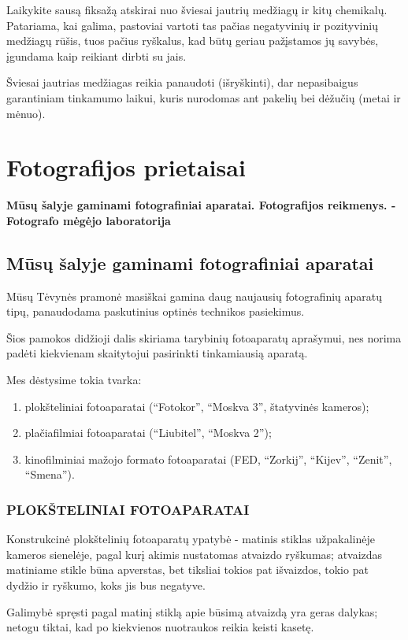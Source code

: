 \documentclass[12pt]{book}
\begin{document}
				Laikykite sausą fiksažą atskirai nuo šviesai jautrių medžiagų ir kitų chemikalų.\\

				Patariama, kai galima, pastoviai vartoti tas pačias negatyvinių ir pozityvinių medžiagų rūšis, tuos pačius ryškalus, kad būtų geriau pažįstamos jų savybės, įgundama kaip reikiant dirbti su jais.

				Šviesai jautrias medžiagas reikia panaudoti (išryškinti), dar nepasibaigus garantiniam tinkamumo laikui, kuris nurodomas ant pakelių bei dėžučių (metai ir mėnuo).
	\chapter{Fotografijos prietaisai}
		\textbf{Mūsų šalyje gaminami fotografiniai aparatai. Fotografijos reikmenys. - Fotografo mėgėjo laboratorija}
		\section*{Mūsų šalyje gaminami fotografiniai aparatai}
			Mūsų Tėvynės pramonė masiškai gamina daug naujausių fotografinių aparatų tipų, panaudodama paskutinius optinės technikos pasiekimus.

			Šios pamokos didžioji dalis skiriama tarybinių fotoaparatų aprašymui, nes norima padėti kiekvienam skaitytojui pasirinkti tinkamiausią aparatą.

			Mes dėstysime tokia tvarka:
			\begin{enumerate}
				\item plokšteliniai fotoaparatai (``Fotokor'', ``Moskva 3'', štatyvinės kameros);
				\item plačiafilmiai fotoaparatai (``Liubitel'', ``Moskva 2'');
				\item kinofilminiai mažojo formato fotoaparatai (FED, ``Zorkij'', ``Kijev'', ``Zenit'', ``Smena'').
			\end{enumerate}
		\subsection*{PLOKŠTELINIAI FOTOAPARATAI}
			Konstrukcinė plokštelinių fotoaparatų ypatybė - matinis stiklas užpakalinėje kameros sienelėje, pagal kurį akimis nustatomas atvaizdo ryškumas; atvaizdas matiniame stikle būna apverstas, bet tiksliai tokios pat išvaizdos, tokio pat dydžio ir ryškumo, koks jis bus negatyve.

			Galimybė spręsti pagal matinį stiklą apie būsimą atvaizdą yra geras dalykas; netogu tiktai, kad po kiekvienos nuotraukos reikia keisti kasetę.
\end{document}
